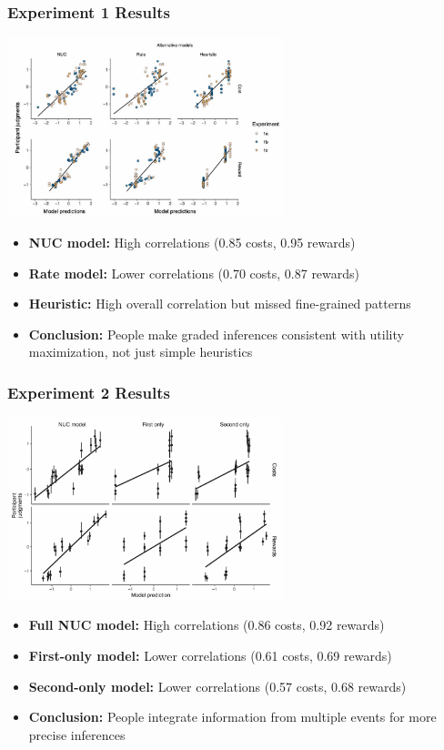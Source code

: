 \documentclass{beamer}
\begin{document}
\begin{frame}
\frametitle{Experiment 1 Results}
\begin{center}
\includegraphics[width=0.6\textwidth]{results_1.png}
\end{center}

\vspace{0.05cm}
\begin{itemize}
    \item \textbf{NUC model:} High correlations (0.85 costs, 0.95 rewards)
    \item \textbf{Rate model:} Lower correlations (0.70 costs, 0.87 rewards) 
    \item \textbf{Heuristic:} High overall correlation but missed fine-grained patterns
    \item \textbf{Conclusion:} People make graded inferences consistent with utility maximization, not just simple heuristics
\end{itemize}

\end{frame}

\begin{frame}
\frametitle{Experiment 2 Results}
\begin{center}
\includegraphics[width=0.6\textwidth]{results_2.png}
\end{center}

\vspace{0.05cm}
\begin{itemize}
    \item \textbf{Full NUC model:} High correlations (0.86 costs, 0.92 rewards)
    \item \textbf{First-only model:} Lower correlations (0.61 costs, 0.69 rewards)
    \item \textbf{Second-only model:} Lower correlations (0.57 costs, 0.68 rewards)
    \item \textbf{Conclusion:} People integrate information from multiple events for more precise inferences
\end{itemize}
\end{frame}
\end{document}
